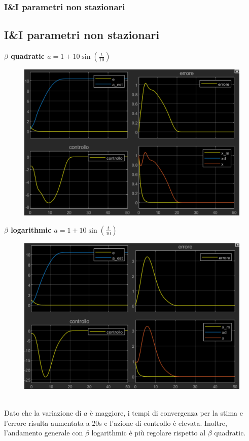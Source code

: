 \documentclass{beamer}
\begin{document}
\begin{frame}
	\frametitle{I\&I parametri non stazionari}
	\subsection{I\&I parametri non stazionari}
	\begin{minipage}[t]{0.45\textwidth}
		\textbf{\(\beta\) quadratic \(a=1+10\sin{(\frac{t}{10})}\)}
		\begin{figure}
			\includegraphics[scale=0.35]{2022-05-21-10-54-48.png} %
		\end{figure}
	\end{minipage}
	\begin{minipage}[t]{0.45\textwidth}
		\textbf{\(\beta\) logarithmic \( a=1+10\sin{(\frac{t}{10})}\)}
		\begin{figure}
			\includegraphics[scale=0.35]{2022-05-21-10-53-30.png} %
		\end{figure}
	\end{minipage}
	\vspace{0.1cm}\\
	Dato che la variazione di \(a\) è maggiore, i tempi di convergenza per la stima e l'errore risulta aumentata a 20s e l'azione di controllo è elevata. Inoltre, l'andamento generale con \(\beta\) logarithmic è più regolare rispetto al \(\beta\) quadratic.
\end{frame}
\end{document}
